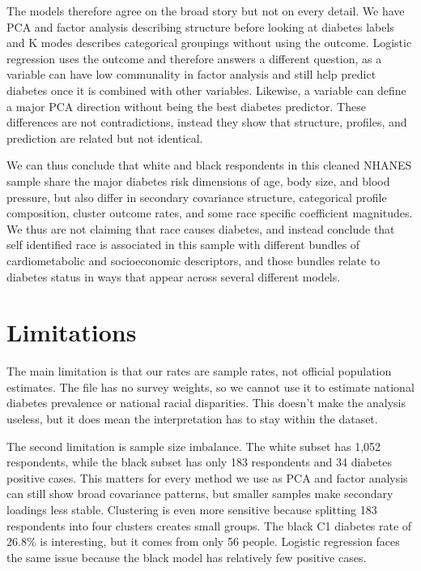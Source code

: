 \documentclass[10pt]{article}
\begin{document}
The models therefore agree on the broad story but not on every detail. We have PCA and factor analysis describing structure before looking at diabetes labels and K modes describes categorical groupings without using the outcome.
Logistic regression uses the outcome and therefore answers a different question, as a variable can have low communality in factor analysis and still help predict diabetes once it is combined with other variables.
Likewise, a variable can define a major PCA direction without being the best diabetes predictor. These differences are not contradictions, instead they show that structure, profiles, and prediction are related but not identical.

We can thus conclude that white and black respondents in this cleaned NHANES sample share the major diabetes risk dimensions of age, body size, and blood pressure, but also differ in secondary covariance structure, categorical profile composition,
cluster outcome rates, and some race specific coefficient magnitudes. We thus are not claiming that race causes diabetes, and instead conclude that self identified race is associated in this sample with different bundles of cardiometabolic and socioeconomic descriptors,
and those bundles relate to diabetes status in ways that appear across several different models.

\section{Limitations}

The main limitation is that our rates are sample rates, not official population estimates. The file has no survey weights, so we cannot use it to estimate national diabetes prevalence or national racial disparities.
This doesn't make the analysis useless, but it does mean the interpretation has to stay within the dataset.

The second limitation is sample size imbalance. The white subset has 1,052 respondents, while the black subset has only 183 respondents and 34 diabetes positive cases. This matters for every method we use as PCA and factor analysis can still show broad covariance patterns, but smaller samples make secondary loadings less stable.
Clustering is even more sensitive because splitting 183 respondents into four clusters creates small groups. The black C1 diabetes rate of $26.8\%$ is interesting, but it comes from only 56 people. Logistic regression faces the same issue because the black model has relatively few positive cases.
\end{document}
